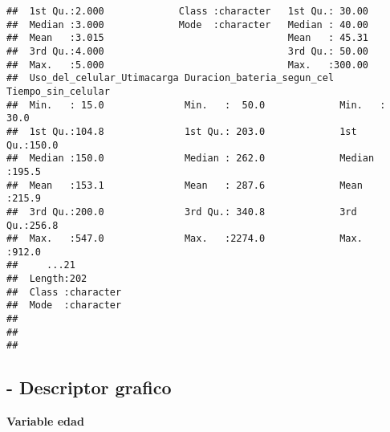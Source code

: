 \documentclass[
]{article}
\begin{document}
\begin{verbatim}
##  1st Qu.:2.000             Class :character   1st Qu.: 30.00  
##  Median :3.000             Mode  :character   Median : 40.00  
##  Mean   :3.015                                Mean   : 45.31  
##  3rd Qu.:4.000                                3rd Qu.: 50.00  
##  Max.   :5.000                                Max.   :300.00  
##  Uso_del_celular_Utimacarga Duracion_bateria_segun_cel Tiempo_sin_celular
##  Min.   : 15.0              Min.   :  50.0             Min.   : 30.0     
##  1st Qu.:104.8              1st Qu.: 203.0             1st Qu.:150.0     
##  Median :150.0              Median : 262.0             Median :195.5     
##  Mean   :153.1              Mean   : 287.6             Mean   :215.9     
##  3rd Qu.:200.0              3rd Qu.: 340.8             3rd Qu.:256.8     
##  Max.   :547.0              Max.   :2274.0             Max.   :912.0     
##     ...21          
##  Length:202        
##  Class :character  
##  Mode  :character  
##                    
##                    
## 
\end{verbatim}

\hypertarget{descriptor-grafico}{%
\subsection{- Descriptor grafico}\label{descriptor-grafico}}

\textbf{Variable edad}
\end{document}
